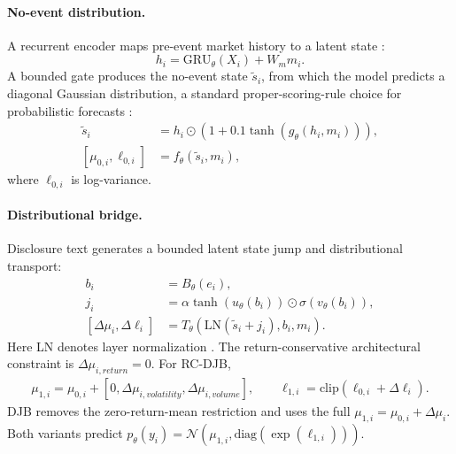 \documentclass[10pt,letterpaper]{article}
\begin{document}
\paragraph{No-event distribution.}
A recurrent encoder maps pre-event market history to a latent state \citep{cho2014learning}:
\begin{equation}
    h_i = \mathrm{GRU}_\theta(X_i) + W_m m_i .
\end{equation}
A bounded gate produces the no-event state \(\tilde{s}_i\), from which the model predicts a
diagonal Gaussian distribution, a standard proper-scoring-rule choice for probabilistic forecasts
\citep{gneiting2007strictly,salinas2020deepar}:
\begin{align}
    \tilde{s}_i &= h_i \odot (1 + 0.1 \tanh(g_\theta(h_i,m_i))),\\
    [\mu_{0,i}, \ell_{0,i}] &= f_\theta(\tilde{s}_i,m_i),
\end{align}
where \(\ell_{0,i}\) is log-variance.

\paragraph{Distributional bridge.}
Disclosure text generates a bounded latent state jump and distributional transport:
\begin{align}
    b_i &= B_\theta(e_i),\\
    j_i &= \alpha \tanh(u_\theta(b_i)) \odot \sigma(v_\theta(b_i)),\\
    [\Delta \mu_i, \Delta \ell_i] &= T_\theta(\mathrm{LN}(\tilde{s}_i+j_i), b_i, m_i).
\end{align}
Here LN denotes layer normalization \citep{ba2016layer}. The return-conservative architectural
constraint is \(\Delta \mu_{i,return}=0\). For RC-DJB,
\begin{align}
    \mu_{1,i} =
    \mu_{0,i} + [0,\Delta\mu_{i,volatility},\Delta\mu_{i,volume}],
    \qquad
    \ell_{1,i} = \mathrm{clip}(\ell_{0,i}+\Delta\ell_i).
\end{align}
DJB removes the zero-return-mean restriction and uses the full
\(\mu_{1,i}=\mu_{0,i}+\Delta\mu_i\). Both variants predict
\(p_\theta(y_i)=\mathcal{N}(\mu_{1,i},\mathrm{diag}(\exp(\ell_{1,i})))\).

\end{document}
